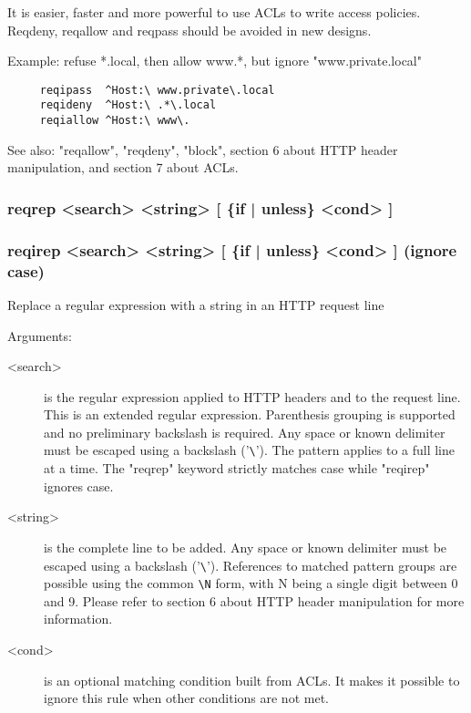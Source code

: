   It is easier, faster and more powerful to use ACLs to write access policies.
  Reqdeny, reqallow and reqpass should be avoided in new designs.

  Example: refuse *.local, then allow www.*, but ignore "www.private.local"
  \begin{verbatim}
     reqipass  ^Host:\ www.private\.local
     reqideny  ^Host:\ .*\.local
     reqiallow ^Host:\ www\.
  \end{verbatim}

  See also: "reqallow", "reqdeny", "block", section 6 about HTTP header
            manipulation, and section 7 about ACLs.

\subsubsection[reqrep]{reqrep <search> <string> [ \{if | unless\} <cond> ]}
\subsubsection[reqirep]{reqirep <search> <string> [ \{if | unless\} <cond> ] (ignore case)}


  Replace a regular expression with a string in an HTTP request line

 
  Arguments:
  \begin{description}
  \item[<search>] is the regular expression applied to HTTP headers and to the
              request line. This is an extended regular expression. Parenthesis
              grouping is supported and no preliminary backslash is required.
              Any space or known delimiter must be escaped using a backslash
              ('\verb|\|'). The pattern applies to a full line at a time. The "reqrep"
              keyword strictly matches case while "reqirep" ignores case.

  \item[<string>] is the complete line to be added. Any space or known delimiter
              must be escaped using a backslash ('\verb|\|'). References to matched
              pattern groups are possible using the common \verb|\N| form, with N
              being a single digit between 0 and 9. Please refer to section
              6 about HTTP header manipulation for more information.

  \item[<cond>] is an optional matching condition built from ACLs. It makes it
              possible to ignore this rule when other conditions are not met.
  \end{description}

